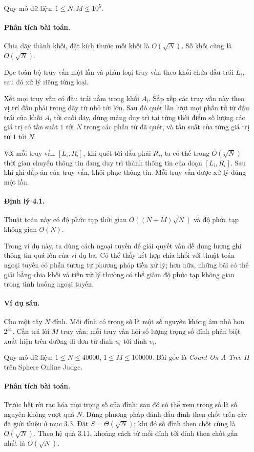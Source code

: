 \documentclass[11pt]{article}
\begin{document}
Quy mô dữ liệu: \(1\le N,M\le 10^5\).

\paragraph{Phân tích bài toán.}
Chia dãy thành khối, đặt kích thước mỗi khối là \(O(\sqrt N)\). Số khối cũng
là \(O(\sqrt N)\).

Đọc toàn bộ truy vấn một lần và phân loại truy vấn theo khối chứa đầu trái
\(L_i\), sau đó xử lý riêng từng loại.

Xét mọi truy vấn có đầu trái nằm trong khối \(A_i\). Sắp xếp các truy vấn này
theo vị trí đầu phải trong dãy từ nhỏ tới lớn. Sau đó quét lần lượt mọi phần
tử từ đầu trái của khối \(A_i\) tới cuối dãy, dùng mảng duy trì tại từng thời
điểm số lượng các giá trị có tần suất \(1\) tới \(N\) trong các phần tử đã
quét, và tần suất của từng giá trị từ \(1\) tới \(N\).

Với mỗi truy vấn \([L_i,R_i]\), khi quét tới đầu phải \(R_i\), ta có thể
trong \(O(\sqrt N)\) thời gian chuyển thông tin đang duy trì thành thông tin
của đoạn \([L_i,R_i]\). Sau khi ghi đáp án của truy vấn, khôi phục thông tin.
Mỗi truy vấn được xử lý đúng một lần.

\paragraph{Định lý 4.1.}
Thuật toán này có độ phức tạp thời gian \(O((N+M)\sqrt N)\) và độ phức tạp
không gian \(O(N)\).

Trong ví dụ này, ta dùng cách ngoại tuyến để giải quyết vấn đề dung lượng ghi
thông tin quá lớn của ví dụ ba. Có thể thấy kết hợp chia khối với thuật toán
ngoại tuyến có phần tương tự phương pháp tiền xử lý; hơn nữa, những bài có
thể giải bằng chia khối và tiền xử lý thường có thể giảm độ phức tạp không
gian trong tình huống ngoại tuyến.

\paragraph{Ví dụ sáu.}
Cho một cây \(N\) đỉnh. Mỗi đỉnh có trọng số là một số nguyên không âm nhỏ hơn
\(2^{31}\). Cần trả lời \(M\) truy vấn; mỗi truy vấn hỏi số lượng trọng số
đỉnh phân biệt xuất hiện trên đường đi đơn từ đỉnh \(u_i\) tới đỉnh \(v_i\).

Quy mô dữ liệu: \(1\le N\le 40000\), \(1\le M\le 100000\). Bài gốc là
\emph{Count On A Tree II} trên Sphere Online Judge.

\paragraph{Phân tích bài toán.}
Trước hết rời rạc hóa mọi trọng số của đỉnh; sau đó có thể xem trọng số là
số nguyên không vượt quá \(N\). Dùng phương pháp đánh dấu đỉnh then chốt trên
cây đã giới thiệu ở mục 3.3. Đặt \(S=\Theta(\sqrt N)\); khi đó số đỉnh then
chốt cũng là \(O(\sqrt N)\). Theo hệ quả 3.11, khoảng cách từ mỗi đỉnh tới
đỉnh then chốt gần nhất là \(O(\sqrt N)\).
\end{document}
